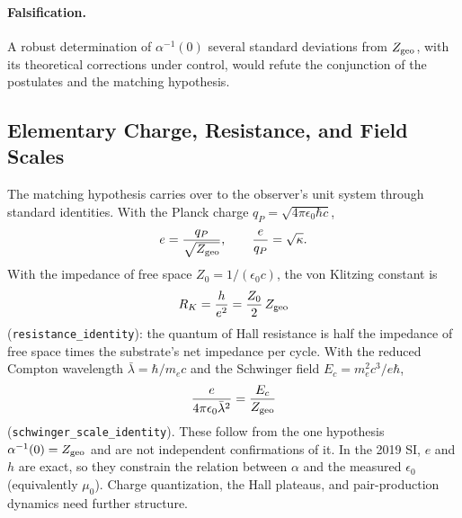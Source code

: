 \paragraph{Falsification.} A robust determination of $\alpha^{-1}(0)$ several standard deviations from $Z_{\rm geo}$, with its theoretical corrections under control, would refute the conjunction of the postulates and the matching hypothesis.

\subsection{Elementary Charge, Resistance, and Field Scales}
\label{sec:elementary_charge}
\label{sec:channel_resistance}
\label{sec:load_limit}
The matching hypothesis carries over to the observer's unit system through standard identities. With the Planck charge $q_P=\sqrt{4\pi\epsilon_0\hbar c}$,
\begin{equation}
e=\frac{q_P}{\sqrt{Z_{\rm geo}}},\qquad \frac{e}{q_P}=\sqrt{\kappa}.
\end{equation}
With the impedance of free space $Z_0=1/(\epsilon_0c)$, the von Klitzing constant is
\begin{equation}
R_K=\frac{h}{e^2}=\frac{Z_0}{2}\,Z_{\rm geo}
\end{equation}
(\texttt{resistance\_identity}): the quantum of Hall resistance is half the impedance of free space times the substrate's net impedance per cycle. With the reduced Compton wavelength $\bar\lambda=\hbar/m_ec$ and the Schwinger field $E_c=m_e^2c^3/e\hbar$\cite{schwinger_gauge_1951},
\begin{equation}
\frac{e}{4\pi\epsilon_0\bar\lambda^2}=\frac{E_c}{Z_{\rm geo}}
\end{equation}
(\texttt{schwinger\_scale\_identity}). These follow from the one hypothesis $\alpha^{-1}(0)=Z_{\rm geo}$ and are not independent confirmations of it. In the 2019 SI, $e$ and $h$ are exact, so they constrain the relation between $\alpha$ and the measured $\epsilon_0$ (equivalently $\mu_0$)\cite{mohr_codata_2025}. Charge quantization, the Hall plateaus\cite{thouless_quantized_1982,kohmoto_topological_1985}, and pair-production dynamics need further structure.
